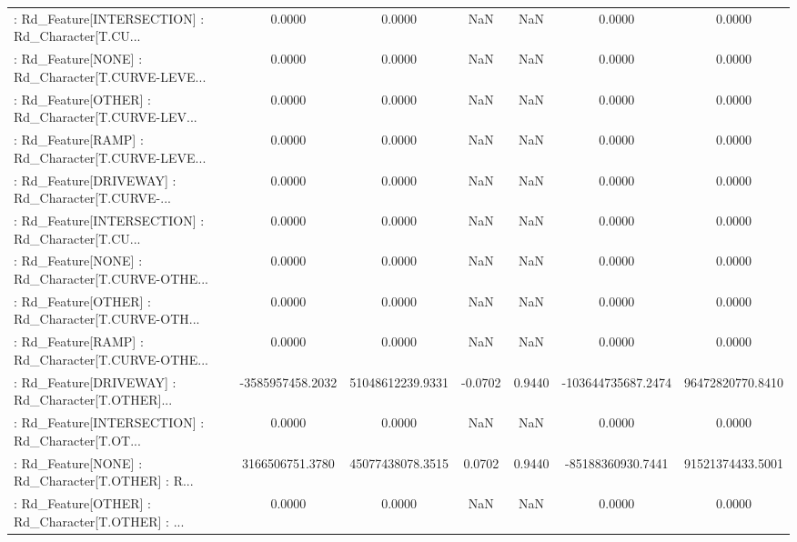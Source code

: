 \begin{longtable}{p{4cm}cccccc}
 : Rd\_Feature[INTERSECTION] : Rd\_Character[T.CU... &            0.0000 &            0.0000 &     NaN &          NaN &             0.0000 &            0.0000 \\
 : Rd\_Feature[NONE] : Rd\_Character[T.CURVE-LEVE... &            0.0000 &            0.0000 &     NaN &          NaN &             0.0000 &            0.0000 \\
 : Rd\_Feature[OTHER] : Rd\_Character[T.CURVE-LEV... &            0.0000 &            0.0000 &     NaN &          NaN &             0.0000 &            0.0000 \\
 : Rd\_Feature[RAMP] : Rd\_Character[T.CURVE-LEVE... &            0.0000 &            0.0000 &     NaN &          NaN &             0.0000 &            0.0000 \\
 : Rd\_Feature[DRIVEWAY] : Rd\_Character[T.CURVE-... &            0.0000 &            0.0000 &     NaN &          NaN &             0.0000 &            0.0000 \\
 : Rd\_Feature[INTERSECTION] : Rd\_Character[T.CU... &            0.0000 &            0.0000 &     NaN &          NaN &             0.0000 &            0.0000 \\
 : Rd\_Feature[NONE] : Rd\_Character[T.CURVE-OTHE... &            0.0000 &            0.0000 &     NaN &          NaN &             0.0000 &            0.0000 \\
 : Rd\_Feature[OTHER] : Rd\_Character[T.CURVE-OTH... &            0.0000 &            0.0000 &     NaN &          NaN &             0.0000 &            0.0000 \\
 : Rd\_Feature[RAMP] : Rd\_Character[T.CURVE-OTHE... &            0.0000 &            0.0000 &     NaN &          NaN &             0.0000 &            0.0000 \\
 : Rd\_Feature[DRIVEWAY] : Rd\_Character[T.OTHER]... &  -3585957458.2032 &  51048612239.9331 & -0.0702 &       0.9440 & -103644735687.2474 &  96472820770.8410 \\
 : Rd\_Feature[INTERSECTION] : Rd\_Character[T.OT... &            0.0000 &            0.0000 &     NaN &          NaN &             0.0000 &            0.0000 \\
 : Rd\_Feature[NONE] : Rd\_Character[T.OTHER] : R... &   3166506751.3780 &  45077438078.3515 &  0.0702 &       0.9440 &  -85188360930.7441 &  91521374433.5001 \\
 : Rd\_Feature[OTHER] : Rd\_Character[T.OTHER] : ... &            0.0000 &            0.0000 &     NaN &          NaN &             0.0000 &            0.0000 \\

\end{longtable}
